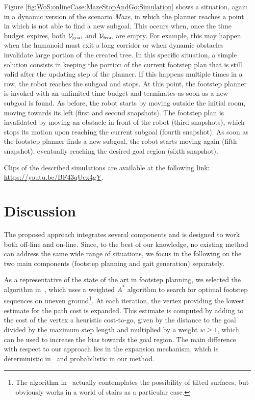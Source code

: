 Figure \ref{fig:WoS:onlineCase:MazeStopAndGo:Simulation} shows a situation,
again in a dynamic version of the scenario \textit{Maze}, in which the planner
reaches a point in which is not able to find a new subgoal. This occurs when,
once the time budget expires, both $\mathcal{V}_{\rm goal}$ and
$\mathcal{V}_{\rm fron}$ are empty.
For example, this may happen when the humanoid must exit a long corridor or when
dynamic obstacles invalidate large portion of the created tree.
In this specific situation, a simple solution consists in keeping the portion of
the current footstep plan that is still valid after the updating step of the
planner. If this happens multiple times in a row, the robot reaches the subgoal
and stops. At this point, the footstep planner is invoked with an unlimited time
budget and terminates as soon as a new subgoal is found. As before, the robot
starts by moving outside the initial room, moving towards its left (first and
second snapshots). The footstep plan is invalidated by moving an obstacle in
front of the robot (third snapshots), which stops its motion upon reaching the
current subgoal (fourth snapshot). As soon as the footstep planner finds a new
subgoal, the robot starts moving again (fifth snapshot), eventually reaching the
desired goal region (sixth snapshot).

Clips of the described simulations are
available at the following link: \url{https://youtu.be/BF43qUcx4gY}.

\section{Discussion}
\label{sec:WoS:discussion}
The proposed approach integrates several components and is designed to work both
off-line and on-line. 
Since, to the best of our knowledge, no existing method can address the same
wide range of situations, we focus in the following on the two main components
(footstep planning and gait generation) separately.

As a representative of the state of the art in footstep planning, we selected
the algorithm in~\cite{Griffin2019ICRA}, which uses a weighted $A^\ast$
algorithm to search for optimal footstep sequences on uneven
ground\footnote{The algorithm in~\cite{Griffin2019ICRA} actually contemplates
the possibility of tilted surfaces, but obviously works in a world of stairs as
a particular case.}. At each iteration, the vertex providing the lowest estimate
for the path cost is expanded. This estimate is computed by adding to the cost
of the vertex a heuristic cost-to-go, given by the distance to the goal divided
by the maximum step length and multiplied by a weight $w\ge 1$, which can be
used to increase the bias towards the goal region. The main difference with
respect to our approach lies in the expansion mechanism, which is deterministic
in~\cite{Griffin2019ICRA} and probabilistic in our method. 

